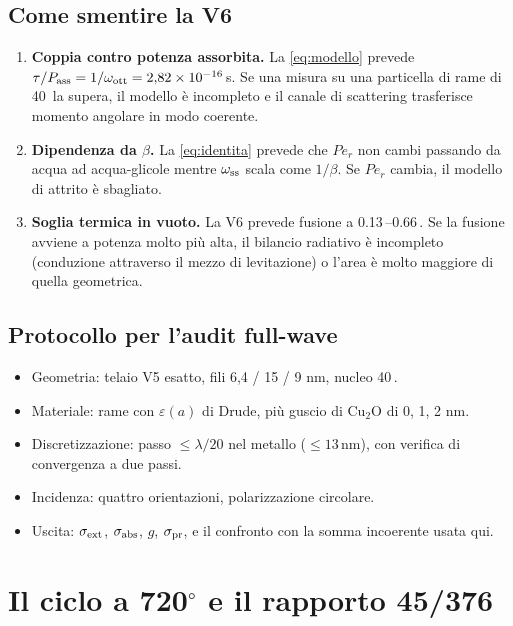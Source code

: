 \documentclass[11pt,a4paper]{article}
\providecommand{\micro}{\textmu}
\providecommand{\SI}[2]{#1\,\text{#2}}
\begin{document}
\subsection{Come smentire la V6}
\begin{enumerate}\itemsep2pt
\item \textbf{Coppia contro potenza assorbita.} La \eqref{eq:modello} prevede
$\tau/P_{\rm ass}=1/\omega_{\rm ott}=2{,}82\times10^{-16}$\,s. Se una misura su una
particella di rame di \SI{40}{nm} la supera, il modello \`e incompleto e il canale di
scattering trasferisce momento angolare in modo coerente.
\item \textbf{Dipendenza da $\beta$.} La \eqref{eq:identita} prevede che $Pe_r$ non
cambi passando da acqua ad acqua-glicole mentre $\omega_{\rm ss}$ scala come
$1/\beta$. Se $Pe_r$ cambia, il modello di attrito \`e sbagliato.
\item \textbf{Soglia termica in vuoto.} La V6 prevede fusione a
\SI{0.13}{}--\SI{0.66}{\micro W}. Se la fusione avviene a potenza molto pi\`u alta, il
bilancio radiativo \`e incompleto (conduzione attraverso il mezzo di levitazione) o
l'area \`e molto maggiore di quella geometrica.
\end{enumerate}

\subsection{Protocollo per l'audit full-wave}
\begin{itemize}\itemsep1pt
\item Geometria: telaio V5 esatto, fili 6,4 / 15 / 9 nm, nucleo \SI{40}{nm}.
\item Materiale: rame con $\varepsilon(a)$ di Drude, pi\`u guscio di Cu$_2$O di
0, 1, 2 nm.
\item Discretizzazione: passo $\le\lambda/20$ nel metallo ($\le\SI{13}{nm}$), con
verifica di convergenza a due passi.
\item Incidenza: quattro orientazioni, polarizzazione circolare.
\item Uscita: $\sigma_{\rm ext}$, $\sigma_{\rm abs}$, $g$, $\sigma_{\rm pr}$, e il
confronto con la somma incoerente usata qui.
\end{itemize}

\appendix
\section{Il ciclo a 720$^\circ$ e il rapporto 45/376}
\label{app:su2}
\end{document}
